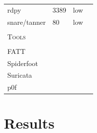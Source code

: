 \begin{table}
\begin{tabularx}{\linewidth}{l|XlX}
        rdpy \cite{rdpy2021}                     & 3389                                                                                                        & low                                                  \\
        snare/tanner \cite{snare2021}            & 80                                                                                                          & low                                                  \\
        \hline                                                                                                                                                                                                     \\
        \textsc{Tools}                           & \multicolumn{3}{c}{}                                                                                                                                            \\
        \hline                                                                                                                                                                                                     \\
        FATT \cite{fatt2021}                     &                                                                                                             &                                                   \\
        Spiderfoot                               &                                                                                                             &                                                   \\
        Suricata                                 &                                                                                                             &                                                   \\
        p0f                                      &                                                                                                             &                                                   \\
        \bottomrule
    \end{tabularx}
    \label{tab:overview-honeypots}
\end{table}

\section{Results}
\label{sec:honeypots-heicloud}

